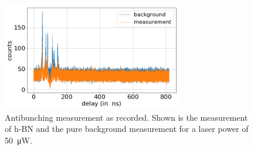 \begin{figure}[H]
    \centering
    \includegraphics[width=0.7\textwidth]{img/output_t2/antibunch_example_50.0muW.png}
    \caption{Antibunching measurement as recorded. Shown is the measurement of h-BN and the pure background measurement for a laser power of \SI{50}{\micro W}.}
    \label{fig_antibunch_raw}
\end{figure}

